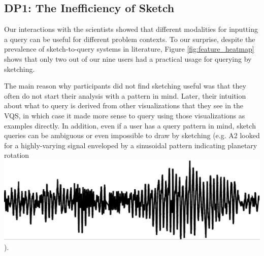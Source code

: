 \subsection{DP1: The Inefficiency of Sketch}
\par Our interactions with the scientists showed that different modalities for inputting a query can be useful for different problem contexts. To our surprise, despite the prevalence of sketch-to-query systems in literature,
Figure \ref{fig:feature_heatmap} shows that only two out of our nine users had a practical usage for querying by sketching. %
\par The main reason why participants did not find sketching useful was that they often do not start their analysis with a pattern in mind. Later, their intuition about what to query is derived from other visualizations that they see in the VQS, in which case it made more sense to query using those visualizations as examples directly. In addition, even if a user has a query pattern in mind, sketch queries can be ambiguous or even impossible to draw by sketching (e.g. A2 looked for a highly-varying signal enveloped by a sinusoidal pattern indicating planetary rotation \includegraphics[width=1.7\baselineskip,keepaspectratio]{figures/impossible_sketch.png}).
